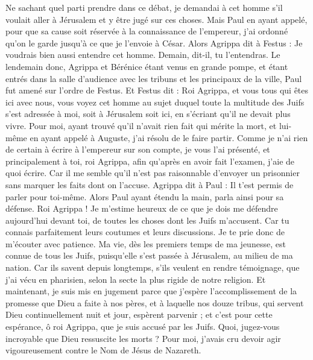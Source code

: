 \begin{multicols}{2}
Ne sachant quel parti prendre dans ce débat, je demandai à cet homme s'il voulait aller à Jérusalem et y être jugé sur ces choses.
Mais Paul en ayant appelé, pour que sa cause soit réservée à la connaissance de l’empereur, j’ai ordonné qu’on le garde jusqu’à ce que je l’envoie à César.
Alors Agrippa dit à Festus : Je voudrais bien aussi entendre cet homme. Demain, dit-il, tu l'entendras.
Le lendemain donc, Agrippa et Bérénice étant venus en grande pompe, et étant entrés dans la salle d’audience avec les tribuns et les principaux de la ville, Paul fut amené sur l’ordre de Festus.
Et Festus dit : Roi Agrippa, et vous tous qui êtes ici avec nous, vous voyez cet homme au sujet duquel toute la multitude des Juifs s’est adressée à moi, soit à Jérusalem soit ici, en s’écriant qu'il ne devait plus vivre.
Pour moi, ayant trouvé qu'il n'avait rien fait qui mérite la mort, et lui-même en ayant appelé à Auguste, j'ai résolu de le faire partir.
Comme je n'ai rien de certain à écrire à l'empereur sur son compte, je vous l'ai présenté, et principalement à toi, roi Agrippa, afin qu'après en avoir fait l'examen, j'aie de quoi écrire.
Car il me semble qu'il n'est pas raisonnable d'envoyer un prisonnier sans marquer les faits dont on l'accuse.
\VerseOne{}Agrippa dit à Paul : Il t'est permis de parler pour toi-même. Alors Paul ayant étendu la main, parla ainsi pour sa défense.
Roi Agrippa ! Je m'estime heureux de ce que je dois me défendre aujourd'hui devant toi, de toutes les choses dont les Juifs m’accusent.
Car tu connais parfaitement leurs coutumes et leurs discussions. Je te prie donc de m’écouter avec patience.
Ma vie, dès les premiers temps de ma jeunesse, est connue de tous les Juifs, puisqu’elle s’est passée à Jérusalem, au milieu de ma nation.
Car ils savent depuis longtemps, s'ils veulent en rendre témoignage, que j'ai vécu en pharisien, selon la secte la plus rigide de notre religion.
Et maintenant, je suis mis en jugement parce que j’espère l’accomplissement de la promesse que Dieu a faite à nos pères,
et à laquelle nos douze tribus, qui servent Dieu continuellement nuit et jour, espèrent parvenir ; et c'est pour cette espérance, ô roi Agrippa, que je suis accusé par les Juifs.
Quoi, jugez-vous incroyable que Dieu ressuscite les morts ?
Pour moi, j’avais cru devoir agir vigoureusement contre le Nom de Jésus de Nazareth.

\end{multicols}
